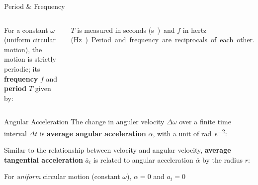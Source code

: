 \documentclass[12pt,compress,aspectratio=169]{beamer}
\begin{document}
\begin{frame}{Period \& Frequency}
  \begin{columns}

    For a constant $\omega$ (uniform circular motion), the motion is strictly
    periodic; its \textbf{frequency} $f$ and \textbf{period} $T$ given by:

    
    $T$ is measured in seconds (\si\second) and $f$ in hertz (\si\hertz).
    Period and frequency are reciprocals of each other.
  \end{columns}
\end{frame}



\begin{frame}{Angular Acceleration}
  The change in anguler velocity $\Delta \omega$ over a finite time interval
  $\Delta t$ is \textbf{average angular acceleration} $\overline\alpha$, with
  a unit of \si{rad\per\second\squared}:


  Similar to the relationship between velocity and angular velocity,
  \textbf{average tangential acceleration} $\overline{a}_t$ is related to
  angular acceleration $\overline\alpha$ by the radius $r$:
    
    
  For \emph{uniform} circular motion (constant $\omega$), $\alpha=0$ and
  $a_t=0$
\end{frame}
\end{document}
